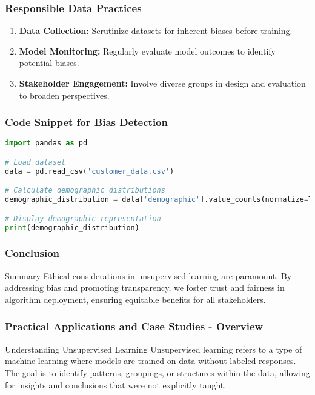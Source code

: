 \documentclass[aspectratio=169]{beamer}
\begin{document}
\begin{frame}[fragile]
    \frametitle{Responsible Data Practices}
    \begin{enumerate}
        \item \textbf{Data Collection:} Scrutinize datasets for inherent biases before training.
        \item \textbf{Model Monitoring:} Regularly evaluate model outcomes to identify potential biases.
        \item \textbf{Stakeholder Engagement:} Involve diverse groups in design and evaluation to broaden perspectives.
    \end{enumerate}
\end{frame}

\begin{frame}[fragile]
    \frametitle{Code Snippet for Bias Detection}
    \begin{lstlisting}[language=Python]
import pandas as pd

# Load dataset
data = pd.read_csv('customer_data.csv')

# Calculate demographic distributions
demographic_distribution = data['demographic'].value_counts(normalize=True)

# Display demographic representation
print(demographic_distribution)
    \end{lstlisting}
\end{frame}

\begin{frame}
    \frametitle{Conclusion}
    \begin{block}{Summary}
        Ethical considerations in unsupervised learning are paramount. By addressing bias and promoting transparency, we foster trust and fairness in algorithm deployment, ensuring equitable benefits for all stakeholders.
    \end{block}
\end{frame}

\begin{frame}[fragile]
    \frametitle{Practical Applications and Case Studies - Overview}
    \begin{block}{Understanding Unsupervised Learning}
        Unsupervised learning refers to a type of machine learning where models are trained on data without labeled responses. The goal is to identify patterns, groupings, or structures within the data, allowing for insights and conclusions that were not explicitly taught.
    \end{block}
\end{frame}
\end{document}
